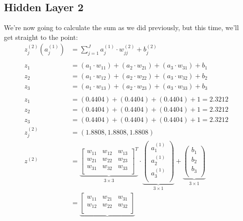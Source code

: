 \documentclass{article}
\begin{document}
\subsection{Hidden Layer 2}
We're now going to calculate the sum as we did previously, but this time, we'll get straight to the point:
\begin{align*}
    z^{(2)}_j(a^{(1)}_j) &= \sum^J_{j=1} a^{(1)}_j\cdot w^{(2)}_{jj} + b^{(2)}_j\\ \\
    z_1 &= (a_1 \cdot w_{11}) + (a_2 \cdot w_{21}) + (a_3 \cdot w_{31}) + b_1 \\
    z_2 &= (a_1 \cdot w_{12}) + (a_2 \cdot w_{22}) + (a_3 \cdot w_{32}) + b_2 \\
    z_3 &= (a_1 \cdot w_{13}) + (a_2 \cdot w_{23}) + (a_3 \cdot w_{33}) + b_3 \\ \\    
    z_1 &= (0.4404) + (0.4404) + (0.4404) + 1 = 2.3212\\ 
    z_2 &= (0.4404) + (0.4404) + (0.4404) + 1 = 2.3212\\
    z_3 &= (0.4404) + (0.4404) + (0.4404) + 1 = 2.3212\\
    z^{(2)}_j &= (1.8808, 1.8808, 1.8808)\\
    z^{(2)} &= 
    \underbrace{
    \begin{bmatrix}
        w_{11} & w_{12} & w_{13} \\
        w_{21} & w_{22} & w_{23} \\
        w_{31} & w_{32} & w_{33} \\
    \end{bmatrix}^T
    }_{3\times 3}
    \cdot
    \underbrace{
    \begin{pmatrix}
        a^{(1)}_1 \\
        a^{(1)}_2 \\
        a^{(1)}_3 \\
    \end{pmatrix}
    }_{3\times 1}
    +
    \underbrace{
    \begin{pmatrix}
        b_1 \\
        b_2 \\
        b_3 \\
    \end{pmatrix}
    }_{3\times 1}\\
    &=
    \underbrace{
    \begin{bmatrix}
        w_{11} & w_{21} & w_{31} \\
        w_{12} & w_{22} & w_{32} \\

\end{bmatrix}}
\end{align*}
\end{document}
